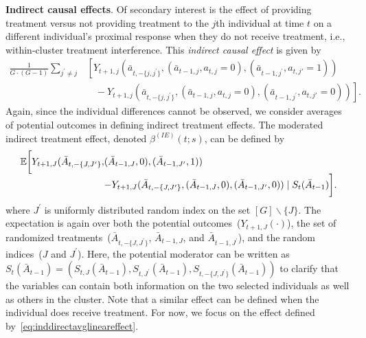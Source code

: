 \documentclass[12pt]{article}
\begin{document}
\noindent \textbf{Indirect causal effects}.
Of secondary interest is the effect of providing treatment versus not providing treatment to the $j$th individual at time $t$ on a different individual's proximal response when they do not receive treatment, i.e., within-cluster treatment interference.  This \emph{indirect causal effect} is given by
\begin{align}
\frac{1}{G \cdot (G-1)} \sum_{j^\prime \neq j}& \left[Y_{t+1,j} (\bar a_{t,-\{j, j^\prime\}}, (\bar a_{t-1,j}, a_{t,j}=0), (\bar a_{t-1,j^\prime}, a_{t,j'}=1)) \right.\nonumber\\
& ~~~~ - \left.Y_{t+1,j} (\bar a_{t,-\{j, j^\prime\}}, (\bar a_{t-1,j}, a_{t,j}=0), (\bar a_{t-1,j^\prime}, a_{t,j'}=0))\nonumber \right].
\end{align}
Again, since the individual differences cannot be observed, we consider averages of potential outcomes in defining indirect treatment effects. The moderated indirect treatment effect, denoted $\beta^{(IE)} (t; s)$, can be defined by
\begin{equation}
\label{eq:inddirectavglineareffect}
\begin{array}{r@{}l}
\mathbb{E} \bigg[ Y_{t+1,J} (\bar A_{t,-\{J, J^\prime\}}, &(\bar A_{t-1,J}, 0), (\bar A_{t-1,J^\prime}, 1)) \\
&- Y_{t+1,J} (\bar A_{t,-\{J, J^\prime\}}, (\bar A_{t-1,J}, 0), (\bar A_{t-1,J^\prime}, 0)) \mid S_t (\bar A_{t-1}) \bigg].
\end{array}
\end{equation}
where $J^\prime$ is uniformly distributed random index on the set $[G] \backslash \{J\}$. The expectation is again over both the potential outcomes~($Y_{t+1,J}(\cdot)$), the set of randomized treatments~($\bar A_{t,-\{J,J^\prime\}}$, $\bar A_{t-1,J}$, and $\bar A_{t-1,J^\prime}$), and the random indices~($J$ and $J^\prime$). Here, the potential moderator can be written as $S_t (\bar A_{t-1}) = \left( S_{t,J} (\bar A_{t-1}), S_{t,J^\prime} (\bar A_{t-1}), S_{t,-\{J, J^\prime \}} (\bar A_{t-1}) \right)$ to clarify that the variables can contain both information on the two selected individuals as well as others in the cluster. Note that a similar effect can be defined when the individual does receive treatment. For now, we focus on the effect defined by~\eqref{eq:inddirectavglineareffect}.

\end{document}
